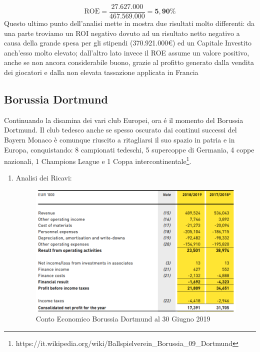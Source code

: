 \documentclass[
    corpo=12pt,
    oneside,
    evenboxes,
    tipotesi=triennale,
    stile=classica,
    oldstyle,
    autoretitolo,
    greek,
]{toptesi}
\begin{document}
\begin{interlinea}{1.5}
\begin{enumerate}
\begin{equation}
            \text{ROE} = \frac{27.627.000}{467.569.000} = \mathbf{5,90\%}
        \label{eqn: roe_psg}
        \end{equation}
        Questo ultimo punto dell'analisi mette in mostra due risultati molto differenti: da una parte troviamo un ROI negativo dovuto ad
        un risultato netto negativo a causa della grande spesa per gli stipendi (370.921.000€) ed un Capitale Investito anch'esso molto elevato;
        dall'altro lato invece il ROE assume un valore positivo, anche se non ancora considerabile buono, grazie al profitto generato dalla 
        vendita dei giocatori e dalla non elevata tassazione applicata in Francia
\end{enumerate}
\subsection{Borussia Dortmund}
Continuando la disamina dei vari club Europei, ora \'e il momento del Borussia Dortmund. Il club tedesco anche se spesso oscurato dai continui
successi del Bayern Monaco è comunque riuscito a ritagliarsi il suo spazio in patria e in Europa, conquistando: 8 campionati tedeschi, 5 supercoppe di Germania, 4 coppe nazionali, 1 Champions League e 1 Coppa
intercontinentale\footnote{https://it.wikipedia.org/wiki/Ballspielverein\_Borussia\_09\_Dortmund}. 
\begin{enumerate}
    \item Analisi dei Ricavi:\newline
        \begin{figure}
            \centering
            \includegraphics[scale=.4]{img/CE_dor.png}
            \caption{Conto Economico Borussia Dortmund al 30 Giugno 2019}
            \label{ce_dor}
        \end{figure}\newline

\end{enumerate}
\end{interlinea}
\end{document}
